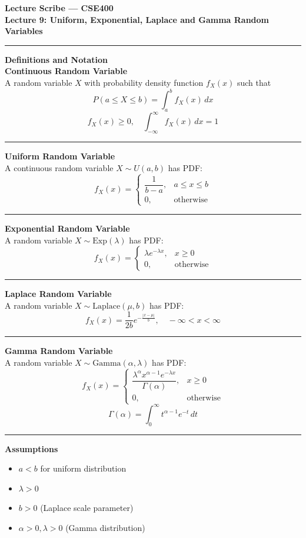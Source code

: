 \documentclass[12pt]{article}
\begin{document}
\begin{center}
\textbf{Lecture Scribe — CSE400} \\
\textbf{Lecture 9: Uniform, Exponential, Laplace and Gamma Random Variables}
\end{center}
\noindent\rule{\textwidth}{0.6pt}
\textbf{Definitions and Notation}\\
\textbf{Continuous Random Variable} \\
A random variable $X$ with probability density function $f_X(x)$ such that
\[
P(a \le X \le b) = \int_a^b f_X(x)\,dx
\]
\[
f_X(x) \ge 0, \quad \int_{-\infty}^{\infty} f_X(x)\,dx = 1
\]
\noindent\rule{\textwidth}{0.6pt}
\textbf{Uniform Random Variable}\\
A continuous random variable $X \sim U(a,b)$ has PDF:
\[
f_X(x) =
\begin{cases}
\dfrac{1}{b-a}, & a \le x \le b \\
0, & \text{otherwise}
\end{cases}
\]
\noindent\rule{\textwidth}{0.6pt}
\textbf{Exponential Random Variable}\\
A random variable $X \sim \mathrm{Exp}(\lambda)$ has PDF:
\[
f_X(x) =
\begin{cases}
\lambda e^{-\lambda x}, & x \ge 0 \\
0, & \text{otherwise}
\end{cases}
\]
\noindent\rule{\textwidth}{0.6pt}
\textbf{Laplace Random Variable}\\
A random variable $X \sim \mathrm{Laplace}(\mu,b)$ has PDF:
\[
f_X(x) = \frac{1}{2b} e^{-\frac{|x-\mu|}{b}}, \quad -\infty < x < \infty
\]
\noindent\rule{\textwidth}{0.6pt}
\textbf{Gamma Random Variable}\\
A random variable $X \sim \mathrm{Gamma}(\alpha,\lambda)$ has PDF:
\[
f_X(x) =
\begin{cases}
\dfrac{\lambda^\alpha x^{\alpha-1} e^{-\lambda x}}{\Gamma(\alpha)}, & x \ge 0 \\
0, & \text{otherwise}
\end{cases}
\]
\[
\Gamma(\alpha) = \int_0^\infty t^{\alpha-1} e^{-t}\,dt
\]
\noindent\rule{\textwidth}{0.6pt}
\newpage
\textbf{Assumptions}
\begin{itemize}[noitemsep,topsep=0pt]
\item $a < b$ for uniform distribution
\item $\lambda > 0$
\item $b > 0$ (Laplace scale parameter)
\item $\alpha > 0, \lambda > 0$ (Gamma distribution)
\end{itemize}
\end{document}
